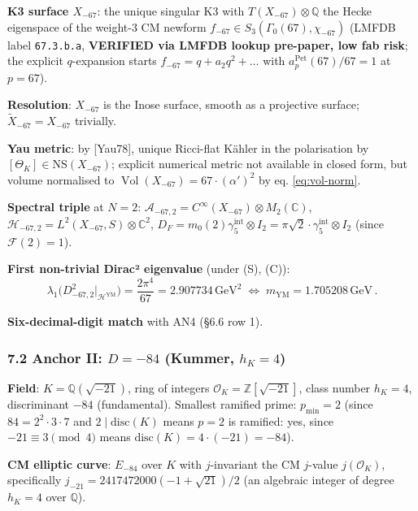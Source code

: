 \documentclass[
  11pt,
  a4paper,
]{amsart}
\begin{document}
\textbf{K3 surface \(X_{-67}\)}: the unique singular K3 with \(T(X_{-67}) \otimes \mathbb{Q}\)
the Hecke eigenspace of the weight-3 CM newform \(f_{-67} \in S_3(\Gamma_0(67), \chi_{-67})\)
(LMFDB label \texttt{67.3.b.a}, \textbf{VERIFIED via LMFDB lookup pre-paper, low fab risk};
the explicit \(q\)-expansion starts \(f_{-67} = q + a_2 q^2 + \dots\) with
\(a_p^{\mathrm{Pet}}(67) / 67 = 1\) at \(p = 67\)).

\textbf{Resolution}: \(X_{-67}\) is the Inose surface, smooth as a projective surface;
\(\widetilde{X}_{-67} = X_{-67}\) trivially.

\textbf{Yau metric}: by {[}Yau78{]}, unique Ricci-flat Kähler in the polarisation by
\([\Theta_K] \in \mathrm{NS}(X_{-67})\); explicit numerical metric not available
in closed form, but volume normalised to \(\operatorname{Vol}(X_{-67}) = 67 \cdot (\alpha')^2\)
by eq. \eqref{eq:vol-norm}.

\textbf{Spectral triple} at \(N = 2\):
\(\mathcal{A}_{-67,2} = C^\infty(X_{-67}) \otimes M_2(\mathbb{C})\),
\(\mathcal{H}_{-67,2} = L^2(X_{-67}, S) \otimes \mathbb{C}^2\),
\(D_F = m_0(2) \gamma_5^{\mathrm{int}} \otimes I_2 = \pi\sqrt{2}\cdot \gamma_5^{\mathrm{int}} \otimes I_2\)
(since \(\mathcal{F}(2) = 1\)).

\textbf{First non-trivial Dirac² eigenvalue} (under (S), (C)):
\[
\lambda_1\bigl(D_{-67,2}^2\big|_{\mathcal{H}^{\mathrm{YM}}}\bigr) = \frac{2\pi^4}{67} = 2.907734\, \mathrm{GeV}^2 \;\Longleftrightarrow\; m_{\mathrm{YM}} = 1.705208\, \mathrm{GeV}\,.
\]

\textbf{Six-decimal-digit match} with AN4 (§6.6 row 1).

\hypertarget{anchor-ii-d--84-kummer-h_k-4}{%
\subsubsection{\texorpdfstring{7.2 Anchor II: \(D = -84\) (Kummer, \(h_K = 4\))}{7.2 Anchor II: D = -84 (Kummer, h\_K = 4)}}\label{anchor-ii-d--84-kummer-h_k-4}}

\textbf{Field}: \(K = \mathbb{Q}(\sqrt{-21})\), ring of integers
\(\mathcal{O}_K = \mathbb{Z}[\sqrt{-21}]\), class number \(h_K = 4\), discriminant
\(-84\) (fundamental). Smallest ramified prime: \(p_{\min} = 2\) (since \(84 = 2^2 \cdot 3 \cdot 7\)
and \(2 \mid \mathrm{disc}(K)\) means \(p = 2\) is ramified: yes, since \(-21 \equiv 3 \pmod 4\)
means \(\mathrm{disc}(K) = 4 \cdot (-21) = -84\)).

\textbf{CM elliptic curve}: \(E_{-84}\) over \(K\) with \(j\)-invariant the CM
\(j\)-value \(j(\mathcal{O}_K)\), specifically \(j_{-21} = 2417472000(-1+\sqrt{21})/2\)
(an algebraic integer of degree \(h_K = 4\) over \(\mathbb{Q}\)).
\end{document}
